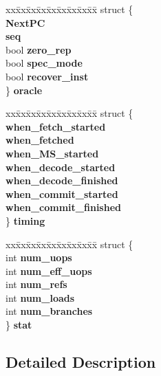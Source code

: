 \begin{CompactItemize}
\begin{tabbing}
\end{tabbing}\item 
\begin{tabbing}
xx\=xx\=xx\=xx\=xx\=xx\=xx\=xx\=xx\=\kill
struct \{\\
 {\bf NextPC}\\
 {\bf seq}\\
\>bool {\bf zero\_rep}\\
\>bool {\bf spec\_mode}\\
\>bool {\bf recover\_inst}\\
\} {\bf oracle}\\

\end{tabbing}\item 
\begin{tabbing}
xx\=xx\=xx\=xx\=xx\=xx\=xx\=xx\=xx\=\kill
struct \{\\
 {\bf when\_fetch\_started}\\
 {\bf when\_fetched}\\
 {\bf when\_MS\_started}\\
 {\bf when\_decode\_started}\\
 {\bf when\_decode\_finished}\\
 {\bf when\_commit\_started}\\
 {\bf when\_commit\_finished}\\
\} {\bf timing}\\

\end{tabbing}\item 
\begin{tabbing}
xx\=xx\=xx\=xx\=xx\=xx\=xx\=xx\=xx\=\kill
struct \{\\
\>int {\bf num\_uops}\\
\>int {\bf num\_eff\_uops}\\
\>int {\bf num\_refs}\\
\>int {\bf num\_loads}\\
\>int {\bf num\_branches}\\
\} {\bf stat}\\

\end{tabbing}\end{CompactItemize}


\subsection{Detailed Description}


